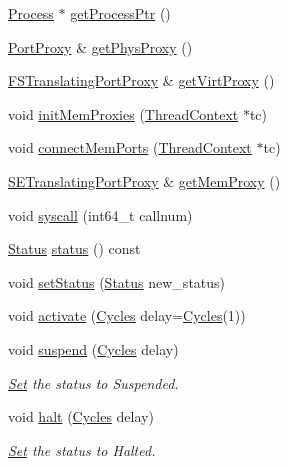 \begin{DoxyCompactItemize}
\hyperlink{classProcess}{Process} $\ast$ \hyperlink{classCheckerThreadContext_a4b26cb784639047bab9de2b306955c4b}{getProcessPtr} ()
\item 
\hyperlink{classPortProxy}{PortProxy} \& \hyperlink{classCheckerThreadContext_a01ed2104c846a24a0e18594d3a2f7de9}{getPhysProxy} ()
\item 
\hyperlink{classFSTranslatingPortProxy}{FSTranslatingPortProxy} \& \hyperlink{classCheckerThreadContext_ac7399661f9073ba4ec121b87c782924b}{getVirtProxy} ()
\item 
void \hyperlink{classCheckerThreadContext_ab24719c7923d7d57030fa05bb166c62c}{initMemProxies} (\hyperlink{classThreadContext}{ThreadContext} $\ast$tc)
\item 
void \hyperlink{classCheckerThreadContext_a3506df24394f8f7b32263dd01979d64a}{connectMemPorts} (\hyperlink{classThreadContext}{ThreadContext} $\ast$tc)
\item 
\hyperlink{classSETranslatingPortProxy}{SETranslatingPortProxy} \& \hyperlink{classCheckerThreadContext_ab07f5af63c9d22e504dfe620c0a07228}{getMemProxy} ()
\item 
void \hyperlink{classCheckerThreadContext_a36e0b96120fcbbc2ee8699158f7be5c2}{syscall} (int64\_\-t callnum)
\item 
\hyperlink{classThreadContext_a67a0db04d321a74b7e7fcfd3f1a3f70b}{Status} \hyperlink{classCheckerThreadContext_a2ad9e92a82d6f783b3061584729c2f4a}{status} () const 
\item 
void \hyperlink{classCheckerThreadContext_acdf331c877974ed8697216475a21998d}{setStatus} (\hyperlink{classThreadContext_a67a0db04d321a74b7e7fcfd3f1a3f70b}{Status} new\_\-status)
\item 
void \hyperlink{classCheckerThreadContext_ab542a5cf9ce4b41042d61e42dfe3aeab}{activate} (\hyperlink{classCycles}{Cycles} delay=\hyperlink{classCycles}{Cycles}(1))
\item 
void \hyperlink{classCheckerThreadContext_a197ef8a0b017208563e0a899c69559e8}{suspend} (\hyperlink{classCycles}{Cycles} delay)
\begin{DoxyCompactList}\small\item\em \hyperlink{classSet}{Set} the status to Suspended. \item\end{DoxyCompactList}\item 
void \hyperlink{classCheckerThreadContext_aacddd436c183735798f7c5abbb7d6824}{halt} (\hyperlink{classCycles}{Cycles} delay)
\begin{DoxyCompactList}\small\item\em \hyperlink{classSet}{Set} the status to Halted. \item\end{DoxyCompactList}\item 

\end{DoxyCompactItemize}
